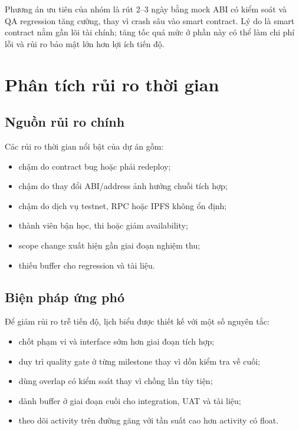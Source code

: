 Phương án ưu tiên của nhóm là rút 2--3 ngày bằng mock ABI có kiểm soát và QA regression tăng cường, thay vì crash sâu vào smart contract. Lý do là smart contract nằm gần lõi tài chính; tăng tốc quá mức ở phần này có thể làm chi phí lỗi và rủi ro bảo mật lớn hơn lợi ích tiến độ.

\iffalse
\section{Phân tích rủi ro thời gian}

\subsection{Nguồn rủi ro chính}

Các rủi ro thời gian nổi bật của dự án gồm:

\begin{itemize}
  \item chậm do contract bug hoặc phải redeploy;
  \item chậm do thay đổi ABI/address ảnh hưởng chuỗi tích hợp;
  \item chậm do dịch vụ testnet, RPC hoặc IPFS không ổn định;
  \item thành viên bận học, thi hoặc giảm availability;
  \item scope change xuất hiện gần giai đoạn nghiệm thu;
  \item thiếu buffer cho regression và tài liệu.
\end{itemize}

\subsection{Biện pháp ứng phó}

Để giảm rủi ro trễ tiến độ, lịch biểu được thiết kế với một số nguyên tắc:

\begin{itemize}
  \item chốt phạm vi và interface sớm hơn giai đoạn tích hợp;
  \item duy trì quality gate ở từng milestone thay vì dồn kiểm tra về cuối;
  \item dùng overlap có kiểm soát thay vì chồng lấn tùy tiện;
  \item dành buffer ở giai đoạn cuối cho integration, UAT và tài liệu;
  \item theo dõi activity trên đường găng với tần suất cao hơn activity có float.
\end{itemize}

